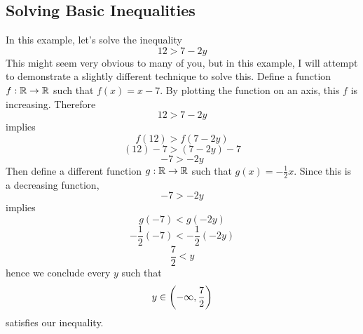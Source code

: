 \subsection{Solving Basic Inequalities}
\begin{ex}
	In this example, let's solve the inequality
	$$12 > 7-2y$$
	This might seem very obvious to many of you, but in this example, I will attempt to demonstrate a slightly different technique to solve this.
	Define a function $f:\mathbb{R}\to\mathbb{R}$ such that $f(x)=x-7$.
	By plotting the function on an axis, this $f$ is increasing. Therefore
	$$12 > 7-2y$$
	implies
	$$f(12)>f(7-2y)$$
	$$(12)-7>(7-2y)-7$$
	$$-7>-2y$$
	Then define a different function $g:\mathbb{R}\to\mathbb{R}$ such that $g(x)=-\frac{1}{2}x$.
	Since this is a decreasing function,
	$$-7>-2y$$
	implies
	$$g(-7)<g(-2y)$$
	$$-\frac{1}{2}(-7)<-\frac{1}{2}(-2y)$$
	$$\frac{7}{2}<y$$
	hence we conclude every $y$ such that
	$$y\in\left(-\infty,\frac{7}{2}\right)$$
	satisfies our inequality.
	\label{ex:basicineq}
\end{ex}
